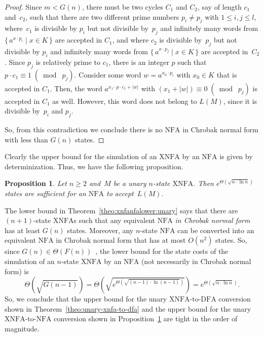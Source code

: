 \documentclass[final,copyright,noderivs]{eptcs}
\theoremstyle{plain}
\newtheorem{proposition}[theorem]{Proposition}
\theoremstyle{definition}
\newcommand{\dfa}{\textrm{DFA}}
\newcommand{\nfa}{\textrm{NFA}}
\newcommand{\xnfa}{\textrm{XNFA}}
\begin{document}
\begin{proof}
Since $m< G(n)$, there must be two cycles $C_1$ and $C_2$, say of length $c_1$ and~$c_2$,
such that there are two different prime numbers $p_i\ne p_j$ with $1\leq i,j
\leq l$, where~$c_1$ is divisible by $p_i$ but not divisible by~$p_j$
and infinitely many words from $\{\,a^{x\cdot p_i} \mid x\in K \,\}$ are
accepted in $C_1$, and
where $c_2$ is divisible by~$p_j$ but not divisible by $p_i$
and infinitely many words from $\{\,a^{x\cdot p_j} \mid x\in K \,\}$ are
accepted in~$C_2$.
%
Since $p_j$ is relatively prime to $c_1$, there is an integer
$p$ such that \mbox{$p\cdot c_1 \equiv 1\; (\bmod\;  p_j)$.} 
Consider some word $w=a^{x_0\cdot p_i}$ with $x_0\in K$
that is accepted in $C_1$. 
Then, the word $a^{x_1\cdot p\cdot c_1+|w|}$ with $(x_1+|w|) \equiv 0\; (\bmod\; p_j)$
is accepted in $C_1$ as well. 
However, this word does not belong to $L(M)$, since it is
divisible by~$p_i$ and $p_j$. 

So, from this contradiction we conclude there is no $\nfa$ in
Chrobak normal form with less than $G(n)$ states. 
\end{proof}

Clearly the upper bound for the simulation of an $\xnfa$ by an $\nfa$ is given
by determinization. 
Thus, we have the following proposition.

\begin{proposition}\label{prop:xnfanfalower:unary2} 
Let $n\geq 2$ and~$M$ be a unary $n$-state $\xnfa$.
Then $e^{\Theta(\sqrt{n\cdot\ln n})}$ states are sufficient 
for an $\nfa$ to accept~$L(M)$. 
\end{proposition}


The lower bound in Theorem~\ref{theo:xnfanfalower:unary} 
says that there are $(n+1)$-state $\xnfa$s such that any equivalent
$\nfa$ \emph{in Chrobak normal form} has at least $G(n)$ states.
Moreover, any $n$-state $\nfa$ can be converted into an equivalent
$\nfa$ in Chrobak normal form that has at most $O(n^2)$ states.
So, since $G(n)\in \Theta(F(n))$~\cite{miller:1987:mog},
the lower bound for the state costs of the simulation of an 
$n$-state $\xnfa$ by an $\nfa$ (not necessarily in Chrobak normal form)
is
$$
\Theta(\sqrt{G(n-1)}) = \Theta(\sqrt{e^{\Theta(\sqrt{(n-1)\cdot\ln
      (n-1)})}})
= e^{\Theta(\sqrt{n\cdot\ln n})}.
$$
So, we conclude that the upper bound for the unary $\xnfa$-to-$\dfa$ conversion
shown in Theorem~\ref{theo:unary-xnfa-to-dfa} and the 
upper bound for the unary $\xnfa$-to-$\nfa$ conversion
shown in Proposition~\ref{prop:xnfanfalower:unary2}
are tight in the order of magnitude.
\end{document}
